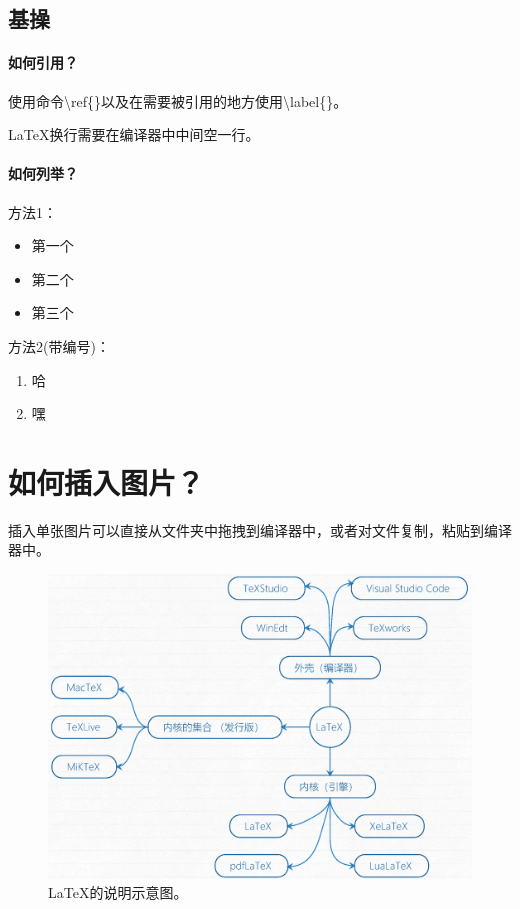 \documentclass[]{article}	%
\begin{document}
\subsection{基操}
\label{sec.intro.jicao}

\paragraph{如何引用？}  %

使用命令\textbackslash ref\{\}以及在需要被引用的地方使用\textbackslash label\{\}。

\LaTeX 换行需要在编译器中中间空一行。

\paragraph{如何列举？}

方法1：
\begin{itemize}
	\item 第一个
	\item 第二个
	\item 第三个
\end{itemize}

方法2(带编号)：
\begin{enumerate}[(1).]
	\item 哈
	\item 嘿
\end{enumerate}

\clearpage
\section{如何插入图片？}

插入单张图片可以直接从文件夹中拖拽到编译器中，或者对文件复制，粘贴到编译器中。
\begin{figure}[htbp]
	\centering
	\includegraphics[width=1\linewidth]{Figures/Figure1_LaTeXIntro}
	\caption{\LaTeX 的说明示意图。}
	\label{fig:figure1latexintro}
\end{figure}
\end{document}
